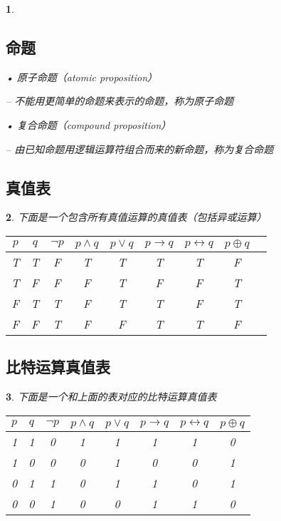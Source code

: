 \documentclass[UTF8]{report}
\theoremstyle{MyLineTheoremStyle} %
\theoremstyle{MyBlockTheoremStyle} %
\theoremstyle{MySubsubsectionStyle} %
\newtheorem{definition}{}
\begin{document}
\begin{definition}
\subsection{命题}
• 原子命题（atomic proposition）\par
– 不能用更简单的命题来表示的命题，称为原子命题\par
• 复合命题（compound proposition）\par
– 由已知命题用逻辑运算符组合而来的新命题，称为复合命题\par
\end{definition}

\subsection{真值表}
\begin{definition}
下面是一个包含所有真值运算的真值表（包括异或运算）
\begin{table}[H]
\centering
\begin{tabular}{|c|c|c|c|c|c|c|c|c|}
\hline
$p$ & $q$ & $\neg p$ & $p \land q$ & $p \lor q$ & $p \rightarrow q$ & $p \leftrightarrow q$ & $p \oplus q$  \\
\hline
T & T & F & T & T & T & T & F  \\
T & F & F & F & T & F & F & T  \\
F & T & T & F & T & T & F & T  \\
F & F & T & F & F & T & T & F  \\
\hline
\end{tabular}
\end{table}
\end{definition}

\subsection{比特运算真值表}
\begin{definition}
下面是一个和上面的表对应的比特运算真值表
\begin{table}[H]
\centering
\begin{tabular}{|c|c|c|c|c|c|c|c|}
\hline
$p$ & $q$ & $\neg p$ & $p \land q$ & $p \lor q$ & $p \rightarrow q$ & $p \leftrightarrow q$ & $p \oplus q$  \\
\hline
1 & 1 & 0 & 1 & 1 & 1 & 1 & 0  \\
1 & 0 & 0 & 0 & 1 & 0 & 0 & 1  \\
0 & 1 & 1 & 0 & 1 & 1 & 0 & 1  \\
0 & 0 & 1 & 0 & 0 & 1 & 1 & 0  \\
\hline
\end{tabular}
\end{table}
\end{definition}
\end{document}
